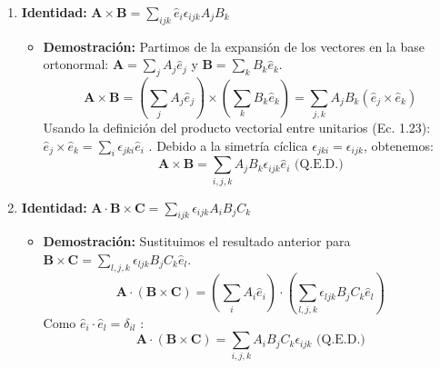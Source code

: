\documentclass[a4paper]{article}
\begin{document}
\begin{enumerate}
    \item \textbf{Identidad:} $\mathbf{A} \times \mathbf{B} = \sum_{ijk} \hat{e}_i \epsilon_{ijk} A_j B_k$
    \begin{itemize}
        \item \textbf{Demostración:} Partimos de la expansión de los vectores en la base ortonormal: $\mathbf{A} = \sum_j A_j \hat{e}_j$ y $\mathbf{B} = \sum_k B_k \hat{e}_k$.
        \begin{equation*}
            \mathbf{A} \times \mathbf{B} = \left( \sum_j A_j \hat{e}_j \right) \times \left( \sum_k B_k \hat{e}_k \right) = \sum_{j,k} A_j B_k (\hat{e}_j \times \hat{e}_k)
        \end{equation*}
        Usando la definición del producto vectorial entre unitarios (Ec. 1.23): $\hat{e}_j \times \hat{e}_k = \sum_i \epsilon_{jki} \hat{e}_i$ \cite{71}.
        Debido a la simetría cíclica $\epsilon_{jki} = \epsilon_{ijk}$, obtenemos:
        \begin{equation*}
            \mathbf{A} \times \mathbf{B} = \sum_{i,j,k} A_j B_k \epsilon_{ijk} \hat{e}_i \text{ (Q.E.D.)}
        \end{equation*}
    \end{itemize}

    \item \textbf{Identidad:} $\mathbf{A} \cdot \mathbf{B} \times \mathbf{C} = \sum_{ijk} \epsilon_{ijk} A_i B_j C_k$
    \begin{itemize}
        \item \textbf{Demostración:} Sustituimos el resultado anterior para $\mathbf{B} \times \mathbf{C} = \sum_{l,j,k} \epsilon_{ljk} B_j C_k \hat{e}_l$.
        \begin{equation*}
            \mathbf{A} \cdot (\mathbf{B} \times \mathbf{C}) = \left( \sum_i A_i \hat{e}_i \right) \cdot \left( \sum_{l,j,k} \epsilon_{ljk} B_j C_k \hat{e}_l \right)
        \end{equation*}
        Como $\hat{e}_i \cdot \hat{e}_l = \delta_{il}$ \cite{42}:
        \begin{equation*}
            \mathbf{A} \cdot (\mathbf{B} \times \mathbf{C}) = \sum_{i,j,k} A_i B_j C_k \epsilon_{ijk} \text{ (Q.E.D.)}
        \end{equation*}
    \end{itemize}


\end{enumerate}
\end{document}
